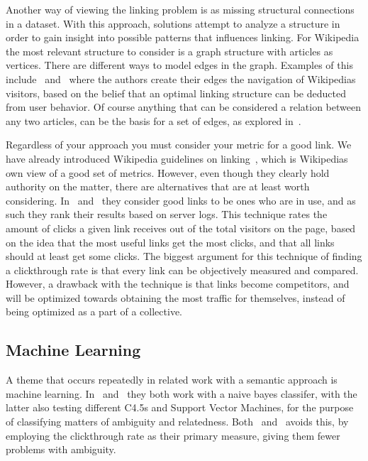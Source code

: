 Another way of viewing the linking problem is as missing structural connections in a dataset. With this approach, solutions attempt to analyze a structure in order to gain insight into possible patterns that influences linking. For Wikipedia the most relevant structure to consider is a graph structure with articles as vertices. There are different ways to model edges in the graph. Examples of this include~\cite{hyperlink-structure-using-logs} and~\cite{west2015mining} where the authors create their edges the navigation of Wikipedias visitors, based on the belief that an optimal linking structure can be deducted from user behavior. Of course anything that can be considered a relation between any two articles, can be the basis for a set of edges, as explored in~\cite{lu2011link}.

Regardless of your approach you must consider your metric for a good link. We have already introduced Wikipedia guidelines on linking~\cite{wiki-editor-guidelines}, which is Wikipedias own view of a good set of metrics. However, even though they clearly hold authority on the matter, there are alternatives that are at least worth considering. In~\cite{hyperlink-structure-using-logs} and~\cite{west2015mining} they consider good links to be ones who are in use, and as such they rank their results based on server logs. This technique rates the amount of clicks a given link receives out of the total visitors on the page, based on the idea that the most useful links get the most clicks, and that all links should at least get some clicks. The biggest argument for this technique of finding a clickthrough rate is that every link can be objectively measured and compared. However, a drawback with the technique is that links become competitors, and will be optimized towards obtaining the most traffic for themselves, instead of being optimized as a part of a collective.

\subsection{Machine Learning}\label{related_machine_learning}

A theme that occurs repeatedly in related work with a semantic approach is machine learning. In~\cite{mihalcea2007wikify} and~\cite{milne2008learning} they both work with a naive bayes classifer, with the latter also testing different C4.5s and Support Vector Machines, for the purpose of classifying matters of ambiguity and relatedness. Both~\cite{hyperlink-structure-using-logs} and~\cite{west2015mining} avoids this, by employing the clickthrough rate as their primary measure, giving them fewer problems with ambiguity.

